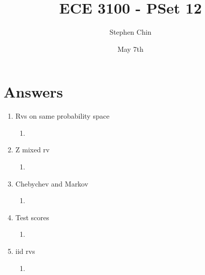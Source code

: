 \documentclass{article}
\title{ECE 3100 - PSet 12}
\author{Stephen Chin}
\date{May 7th}
\begin{document}
\maketitle

\section{Answers}

\begin{enumerate}
\item Rvs on same probability space
  \begin{enumerate}
  \item 
  \end{enumerate}
  
\item Z mixed rv
  \begin{enumerate}
  \item
  \end{enumerate}
  
\item Chebychev and Markov
  \begin{enumerate}
  \item
  \end{enumerate}

\item Test scores
  \begin{enumerate}
  \item
  \end{enumerate}

\item iid rvs
  \begin{enumerate}
  \item
  \end{enumerate}

\end{enumerate}
\end{document}
